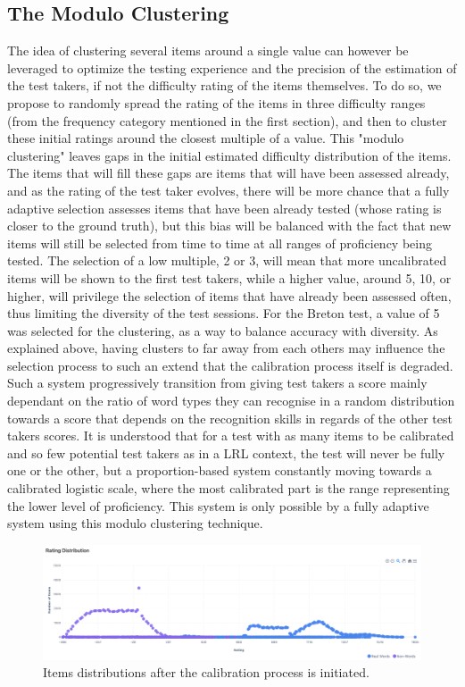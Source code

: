     \subsection{The Modulo Clustering}
The idea of clustering several items around a single value can however be leveraged to optimize the testing experience and the precision of the estimation of the test takers, if not the difficulty rating of the items themselves. To do so, we propose to randomly spread the rating of the items in three difficulty ranges (from the frequency category mentioned in the first section), and then to cluster these initial ratings around the closest multiple of a value. This "modulo clustering" leaves gaps in the initial estimated difficulty distribution of the items. The items that will fill these gaps are items that will have been assessed already, and as the rating of the test taker evolves, there will be more chance that a fully adaptive selection assesses items that have been already tested (whose rating is closer to the ground truth), but this bias will be balanced with the fact that new items will still be selected from time to time at all ranges of proficiency being tested. The selection of a low multiple, 2 or 3, will mean that more uncalibrated items will be shown to the first test takers, while a higher value, around 5, 10, or higher, will privilege the selection of items that have already been assessed often, thus limiting the diversity of the test sessions. For the Breton test, a value of 5 was selected for the clustering, as a way to balance accuracy with diversity. As explained above, having clusters to far away from each others may influence the selection process to such an extend that the calibration process itself is degraded. Such a system progressively transition from giving test takers a score mainly dependant on the ratio of word types they can recognise in a random distribution towards a score that depends on the recognition skills in regards of the other test takers scores. It is understood that for a test with as many items to be calibrated and so few potential test takers as in a LRL context, the test will never be fully one or the other, but a proportion-based system constantly moving towards a calibrated logistic scale, where the most calibrated part is the range representing the lower level of proficiency. This system is only possible by a fully adaptive system using this modulo clustering technique.

\begin{figure}
    \centering
    \includegraphics[width=0.9\linewidth]{figures/distribution-items.png}
    \caption{Items distributions after the calibration process is initiated.}
    \label{fig:distribution}
\end{figure}

